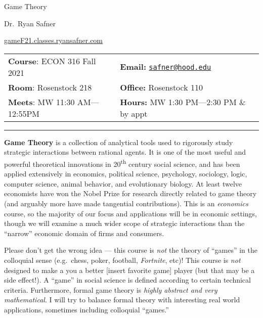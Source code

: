\documentclass{article}
\begin{document}
\sffamily

\centerline{\Huge Game Theory}

\vspace{3 mm}

\centerline{\large Dr.~Ryan Safner}
\vspace{2 mm}
\centerline{\large \href{http://gameF21.classes.ryansafner.com}{gameF21.classes.ryansafner.com}}

\vspace{5 mm}

\begin{tabular}{@{}p{3.5in}p{3.5in}}           
\textbf{Course}: ECON 316 Fall
2021  & \textbf{Email:}  \href{mailto:safner@hood.edu}{\nolinkurl{safner@hood.edu}}\\
\textbf{Room}: Rosenstock 218 & \textbf{Office:}  Rosenstock 110\\
\textbf{Meets}: MW 11:30 AM---12:55PM & \textbf{Hours:}  MW 1:30
PM---2:30 PM \& by appt\\ 
\end{tabular}

\vspace{5 mm}

\hrule


\textbf{Game Theory} is a collection of analytical tools used to
rigorously study strategic interactions between rational agents. It is
one of the most useful and powerful theoretical innovations in
20\textsuperscript{th} century social science, and has been applied
extensively in economics, political science, psychology, sociology,
logic, computer science, animal behavior, and evolutionary biology. At
least twelve economists have won the Nobel Prize for research directly
related to game theory (and arguably more have made tangential
contributions). This is an \emph{economics} course, so the majority of
our focus and applications will be in economic settings, though we will
examine a much wider scope of strategic interactions than the ``narrow''
economic domain of firms and consumers.

Please don't get the wrong idea --- this course is \emph{not} the theory
of ``games'' in the colloquial sense (e.g.~chess, poker, football,
\emph{Fortnite}, etc)! This course is \emph{not} designed to make a you
a better {[}insert favorite game{]} player (but that may be a side
effect!). A ``game'' in social science is defined according to certain
technical criteria. Furthermore, formal game theory is \emph{highly
abstract and very mathematical}. I will try to balance formal theory
with interesting real world applications, sometimes including colloquial
``games.''
\end{document}
